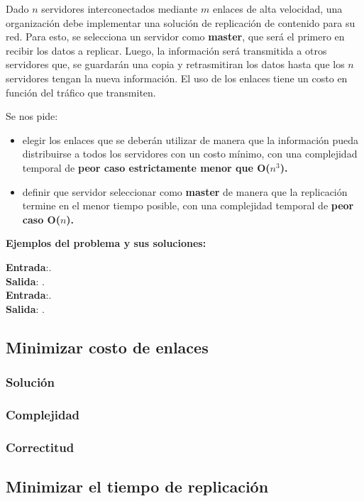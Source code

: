 \documentclass[a4paper, 10pt, twoside]{article}
\begin{document}
Dado $n$ servidores interconectados mediante $m$ enlaces de alta velocidad, una organización debe implementar una solución de replicación de contenido para su red. Para esto, se selecciona un servidor como \textbf{master}, que será el primero en recibir los datos a replicar. Luego, la información será transmitida a otros servidores que, se guardarán una copia y retrasmitiran los datos hasta que los $n$ servidores tengan la nueva información. El uso de los enlaces tiene un costo en función del tráfico que transmiten.

Se nos pide:
\begin{itemize}
    \item{elegir los enlaces que se deberán utilizar de manera que la información pueda distribuirse a todos los servidores con un costo mínimo, con una complejidad temporal de \textbf{peor caso estrictamente menor que O($n^3$).}}
    \item{definir que servidor seleccionar como \textbf{master} de manera que la replicación termine en el menor tiempo posible, con una complejidad temporal de \textbf{peor caso O($n$).}}
\end{itemize}

\textbf{Ejemplos del problema y sus soluciones:}

\textbf{Entrada}:. \\
\textbf{Salida}: . \\

\textbf{Entrada}:. \\
\textbf{Salida}: . \\

\subsection{Minimizar costo de enlaces}

\subsubsection{Solución}

\subsubsection{Complejidad}

\subsubsection{Correctitud}

\subsection{Minimizar el tiempo de replicación}
\end{document}
